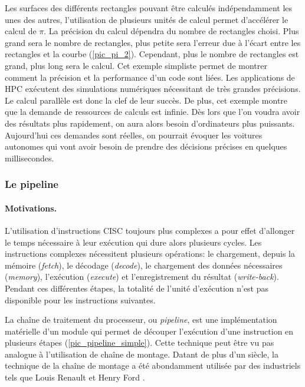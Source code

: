 Les surfaces des différents rectangles pouvant être calculés indépendamment les unes des autres, l'utilisation de plusieurs unités de calcul permet d'accélérer le calcul de $\pi$. La précision du calcul dépendra du nombre de rectangles choisi. Plus grand sera le nombre de rectangles, plus petite sera l'erreur due à l'écart entre les rectangles et la courbe (\autoref{pic_pi_2}). Cependant, plus le nombre de rectangles est grand, plus long sera le calcul. Cet exemple simpliste permet de montrer comment la précision et la performance d'un code sont liées. Les applications de HPC exécutent des simulations numériques nécessitant de très grandes précisions. Le calcul parallèle est donc la clef de leur succès.
De plus, cet exemple montre que la demande de ressources de calculs est infinie. Dès lors que l'on voudra avoir des résultats plus rapidement, on aura alors besoin d'ordinateurs plus puissants. Aujourd'hui ces demandes sont réelles, on pourrait évoquer les voitures autonomes qui vont avoir besoin de prendre des décisions précises en quelques millisecondes. 



\subsubsection{Le pipeline} \label{sec:pipeline}


\paragraph{Motivations.} 

L'utilisation d'instructions CISC toujours plus complexes a pour effet d'allonger le temps nécessaire à leur exécution qui dure alors plusieurs cycles. Les instructions complexes nécessitent plusieurs opérations: le chargement, depuis la mémoire (\textit{fetch}), le décodage (\textit{decode}), le chargement des données nécessaires (\textit{memory}), l'exécution (\textit{execute}) et l'enregistrement du résultat (\textit{write-back}). Pendant ces différentes étapes, la totalité de l'unité d'exécution n'est pas disponible pour les instructions suivantes. 

La chaîne de traitement du processeur, ou \textit{pipeline}, est une implémentation matérielle d'un module qui permet de découper l'exécution d'une instruction en plusieurs étapes (\autoref{pic_pipeline_simple}). Cette technique peut être vu pas analogue à l'utilisation de chaîne de montage. Datant de plus d'un siècle, la technique de la chaîne de montage a été abondamment utilisée par des industriels tels que Louis Renault et Henry Ford \cite{wolff1957entrepreneurs}.



